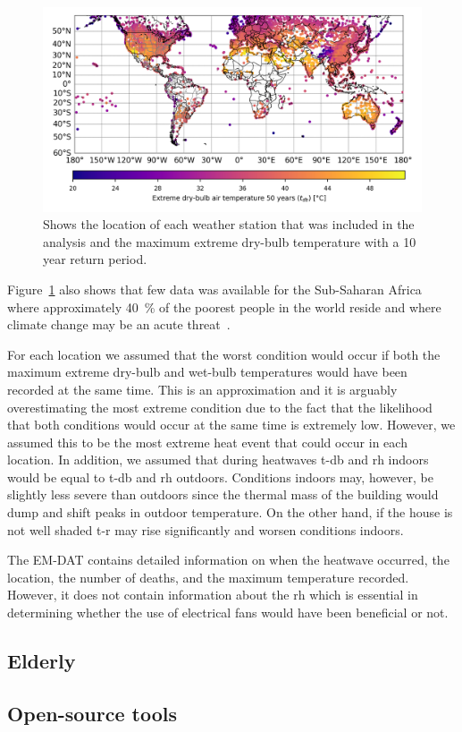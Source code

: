 \begin{figure}[thb!]
    \centering
    \includegraphics[width=\textwidth]{figures/world-map.png}
    \caption{Shows the location of each weather station that was included in the analysis and the maximum extreme dry-bulb temperature with a 10 year return period.}
    \label{fig:world-map}
\end{figure}

Figure~\ref{fig:world-map} also shows that few data was available for the Sub-Saharan Africa where approximately 40~\% of the poorest people in the world reside and where climate change may be an acute threat~\cite{PovertyO1:online}.

For each location we assumed that the worst condition would occur if both the maximum extreme dry-bulb and wet-bulb temperatures would have been recorded at the same time.
This is an approximation and it is arguably overestimating the most extreme condition due to the fact that the likelihood that both conditions would occur at the same time is extremely low.
However, we assumed this to be the most extreme heat event that could occur in each location.
In addition, we assumed that during heatwaves \ac{t-db} and \ac{rh} indoors would be equal to \ac{t-db} and \ac{rh} outdoors.
Conditions indoors may, however, be slightly less severe than outdoors since the thermal mass of the building would dump and shift peaks in outdoor temperature.
On the other hand, if the house is not well shaded \ac{t-r} may rise significantly and worsen conditions indoors.

The EM-DAT contains detailed information on when the heatwave occurred, the location, the number of deaths, and the maximum temperature recorded.
However, it does not contain information about the \ac{rh} which is essential in determining whether the use of electrical fans would have been beneficial or not.

\subsection{Elderly}


\subsection{Open-source tools}


